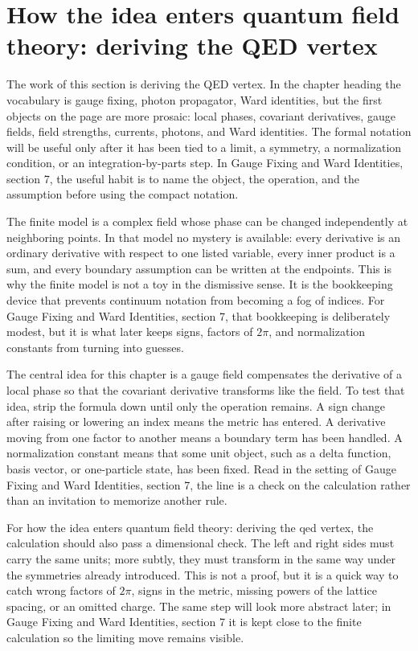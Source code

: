 \section{How the idea enters quantum field theory: deriving the QED vertex}

The work of this section is deriving the QED vertex.  In the chapter heading the vocabulary is gauge fixing, photon propagator, Ward identities, but the first objects on the page are more prosaic: local phases, covariant derivatives, gauge fields, field strengths, currents, photons, and Ward identities.  The formal notation will be useful only after it has been tied to a limit, a symmetry, a normalization condition, or an integration-by-parts step.  In Gauge Fixing and Ward Identities, section 7, the useful habit is to name the object, the operation, and the assumption before using the compact notation.

The finite model is a complex field whose phase can be changed independently at neighboring points.  In that model no mystery is available: every derivative is an ordinary derivative with respect to one listed variable, every inner product is a sum, and every boundary assumption can be written at the endpoints.  This is why the finite model is not a toy in the dismissive sense.  It is the bookkeeping device that prevents continuum notation from becoming a fog of indices.  For Gauge Fixing and Ward Identities, section 7, that bookkeeping is deliberately modest, but it is what later keeps signs, factors of \(2\pi\), and normalization constants from turning into guesses.

The central idea for this chapter is a gauge field compensates the derivative of a local phase so that the covariant derivative transforms like the field.  To test that idea, strip the formula down until only the operation remains.  A sign change after raising or lowering an index means the metric has entered.  A derivative moving from one factor to another means a boundary term has been handled.  A normalization constant means that some unit object, such as a delta function, basis vector, or one-particle state, has been fixed.  Read in the setting of Gauge Fixing and Ward Identities, section 7, the line is a check on the calculation rather than an invitation to memorize another rule.

For how the idea enters quantum field theory: deriving the qed vertex, the calculation should also pass a dimensional check.  The left and right sides must carry the same units; more subtly, they must transform in the same way under the symmetries already introduced.  This is not a proof, but it is a quick way to catch wrong factors of \(2\pi\), signs in the metric, missing powers of the lattice spacing, or an omitted charge.  The same step will look more abstract later; in Gauge Fixing and Ward Identities, section 7 it is kept close to the finite calculation so the limiting move remains visible.

